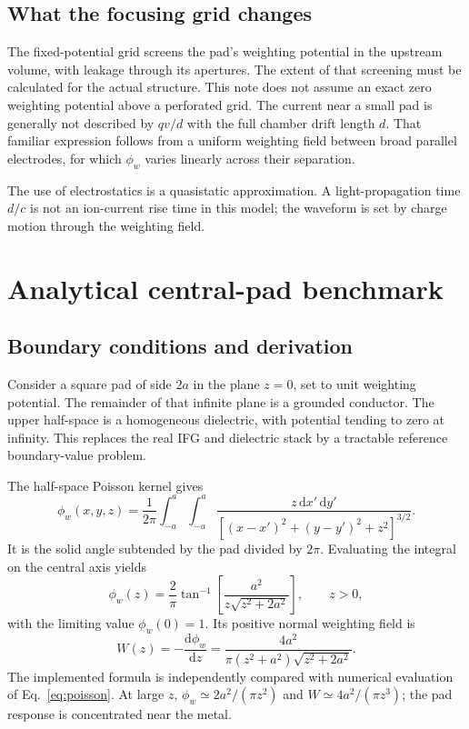 \documentclass[11pt,a4paper]{article}
\newcommand{\dd}{\mathrm{d}}
\begin{document}
\subsection{What the focusing grid changes}
The fixed-potential grid screens the pad's weighting potential in the upstream
volume, with leakage through its apertures. The extent of that screening must
be calculated for the actual structure. This note does not assume an exact zero
weighting potential above a perforated grid. The current near a small pad is
generally not described by $qv/d$ with the full chamber drift length $d$.
That familiar expression follows from a uniform weighting field between broad
parallel electrodes, for which $\phi_w$ varies linearly across their separation.

The use of electrostatics is a quasistatic approximation. A light-propagation
time $d/c$ is not an ion-current rise time in this model; the waveform is set
by charge motion through the weighting field.

\clearpage
\section{Analytical central-pad benchmark}
\subsection{Boundary conditions and derivation}
Consider a square pad of side $2a$ in the plane $z=0$, set to unit weighting
potential. The remainder of that infinite plane is a grounded conductor. The
upper half-space is a homogeneous dielectric, with potential tending to zero
at infinity. This replaces the real IFG and dielectric stack by a tractable
reference boundary-value problem.

The half-space Poisson kernel gives~\cite{salazar2021}
\begin{equation}
 \phi_w(x,y,z)=\frac{1}{2\pi}\int_{-a}^{a}\!\int_{-a}^{a}
 \frac{z\,\dd x'\,\dd y'}{[(x-x')^2+(y-y')^2+z^2]^{3/2}}.
 \label{eq:poisson}
\end{equation}
It is the solid angle subtended by the pad divided by $2\pi$. Evaluating the
integral on the central axis yields
\begin{equation}
 \boxed{\phi_w(z)=\frac{2}{\pi}\tan^{-1}
 \left[\frac{a^2}{z\sqrt{z^2+2a^2}}\right]},\qquad z>0,
 \label{eq:square_phi}
\end{equation}
with the limiting value $\phi_w(0)=1$. Its positive normal weighting field is
\begin{equation}
 W(z)=-\frac{\dd\phi_w}{\dd z}
 =\frac{4a^2}{\pi(z^2+a^2)\sqrt{z^2+2a^2}}.
 \label{eq:square_field}
\end{equation}
The implemented formula is independently compared with numerical evaluation
of Eq.~\eqref{eq:poisson}. At large $z$, $\phi_w\simeq2a^2/(\pi z^2)$ and
$W\simeq4a^2/(\pi z^3)$; the pad response is concentrated near the metal.
\end{document}
